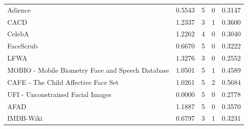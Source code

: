 \documentclass[journal]{IEEEtran}
\begin{document}
\begin{table}[!t]
\begin{tabular}{|p{}|C{0.11\textwidth}|C{0.11\textwidth}|C{0.11\textwidth}|C{0.11\textwidth}|}
Adience \cite{eidinger2014age}                                                          & 0.5543                           & 5                               & 0                                  & 0.3147                    \\
CACD \cite{chen2014cross}                                                               & 1.2337                           & 3                               & 1                                  & 0.3600                    \\
CelebA \cite{liu2015deep}                                                               & 1.2262                           & 4                               & 0                                  & 0.3040                    \\
FaceScrub \cite{ng2014data}                                                             & 0.6670                           & 5                               & 0                                  & 0.3222                    \\
LFWA \cite{liu2015deep}                                                                & 1.3276                           & 3                               & 0                                  & 0.2552                    \\
MOBIO - Mobile Biometry Face and Speech Database \cite{tresadern2012mobile}             & 1.0501                           & 5                               & 1                                  & 0.4589                    \\
CAFE - The Child Affective Face Set \cite{lobue2015child}                               & 1.0261                           & 5                               & 2                                  & 0.5684                    \\
UFI - Unconstrained Facial Images \cite{lenc2015unconstrained}                          & 0.0000                           & 5                               & 0                                  & 0.2778                    \\
AFAD \cite{niu2016ordinal}                                                              & 1.1887                           & 5                               & 0                                  & 0.3570                    \\
IMDB-Wiki \cite{rothe2018deep}                                                          & 0.6797                           & 3                               & 1                                  & 0.3231                    \\

\end{tabular}
\end{table}
\end{document}
